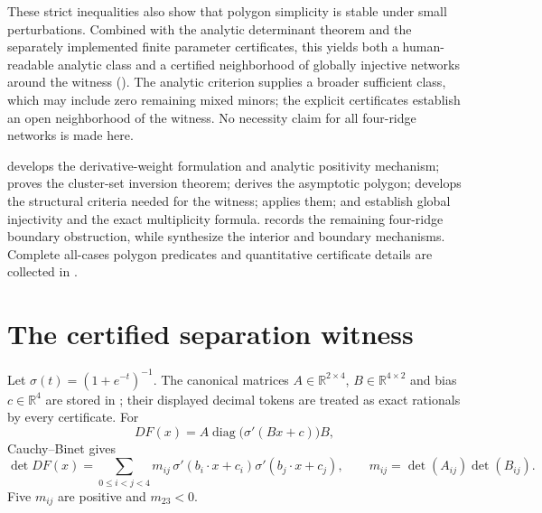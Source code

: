\documentclass[11pt,twoside,leqno]{article}
\theoremstyle{plain}
\theoremstyle{definition}
\theoremstyle{remark}
\newcommand{\R}{\mathbb{R}}
\begin{document}
These strict inequalities also show that polygon simplicity is stable under small perturbations. Combined with the analytic determinant theorem and the separately implemented finite parameter certificates, this yields both a human-readable analytic class and a certified neighborhood of globally injective networks around the witness (). The analytic criterion supplies a broader sufficient class, which may include zero remaining mixed minors; the explicit certificates establish an open neighborhood of the witness. No necessity claim for all four-ridge networks is made here.

 develops the derivative-weight formulation and analytic positivity mechanism;  proves the cluster-set inversion theorem;  derives the asymptotic polygon;  develops the structural criteria needed for the witness;  applies them; and  establish global injectivity and the exact multiplicity formula.  records the remaining four-ridge boundary obstruction, while  synthesize the interior and boundary mechanisms. Complete all-cases polygon predicates and quantitative certificate details are collected in .

\section{The certified separation witness}\label{sec:separation}

Let $\sigma(t)=(1+e^{-t})^{-1}$.  The canonical matrices $A\in\R^{2\times4}$, $B\in\R^{4\times2}$ and bias $c\in\R^4$ are stored in ; their displayed decimal tokens are treated as exact rationals by every certificate.  For
\[
 DF(x)=A\operatorname{diag}\!\bigl(\sigma'(Bx+c)\bigr)B,
\]
Cauchy--Binet gives
\[
 \det DF(x)=\sum_{0\le i<j<4}m_{ij}\,
 \sigma'(b_i\cdot x+c_i)\sigma'(b_j\cdot x+c_j),
 \qquad
 m_{ij}=\det(A_{ij})\det(B_{ij}).
\]
Five $m_{ij}$ are positive and $m_{23}<0$.
\end{document}
